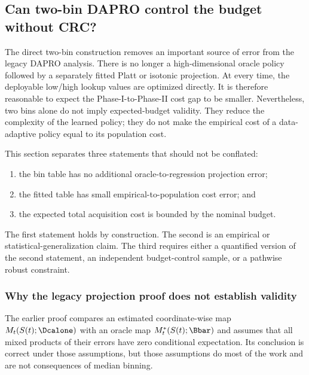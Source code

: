 
\subsection{Can two-bin DAPRO control the budget without CRC?}
\label{sec:k2bc}

The direct two-bin construction removes an important source of error from the
legacy DAPRO analysis.  There is no longer a high-dimensional oracle policy
followed by a separately fitted Platt or isotonic projection.  At every time,
the deployable low/high lookup values are optimized directly.  It is therefore
reasonable to expect the Phase-I-to-Phase-II cost gap to be smaller.
Nevertheless, two bins alone do not imply expected-budget validity.  They
reduce the complexity of the learned policy; they do not make the empirical
cost of a data-adaptive policy equal to its population cost.

This section separates three statements that should not be conflated:
\begin{enumerate}
    \item the bin table has no additional oracle-to-regression projection
    error;
    \item the fitted table has small empirical-to-population cost error; and
    \item the expected total acquisition cost is bounded by the nominal
    budget.
\end{enumerate}
The first statement holds by construction.  The second is an empirical or
statistical-generalization claim.  The third requires either a quantified
version of the second statement, an independent budget-control sample, or a
pathwise robust constraint.

\subsubsection{Why the legacy projection proof does not establish validity}

The earlier proof compares an estimated coordinate-wise map
$M_t(S(t);\Dcalone)$ with an oracle map $M_t^*(S(t);\Bbar)$ and assumes that
all mixed products of their errors have zero conditional expectation.  Its
conclusion is correct under those assumptions, but those assumptions do most
of the work and are not consequences of median binning.

